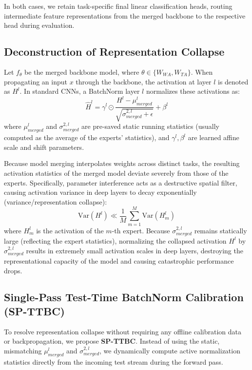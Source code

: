 \documentclass{article}
\theoremstyle{plain}
\theoremstyle{definition}
\theoremstyle{remark}
\begin{document}
In both cases, we retain task-specific final linear classification heads, routing intermediate feature representations from the merged backbone to the respective head during evaluation.

\subsection{Deconstruction of Representation Collapse}
Let $f_{\theta}$ be the merged backbone model, where $\theta \in \{W_{WA}, W_{TA}\}$. When propagating an input $x$ through the backbone, the activation at layer $l$ is denoted as $H^l$. In standard CNNs, a BatchNorm layer $l$ normalizes these activations as:
\begin{equation}
  \hat{H}^l = \gamma^l \odot \frac{H^l - \mu^l_{merged}}{\sqrt{\sigma^{2,l}_{merged} + \epsilon}} + \beta^l
\end{equation}
where $\mu^l_{merged}$ and $\sigma^{2,l}_{merged}$ are pre-saved static running statistics (usually computed as the average of the experts' statistics), and $\gamma^l, \beta^l$ are learned affine scale and shift parameters.

Because model merging interpolates weights across distinct tasks, the resulting activation statistics of the merged model deviate severely from those of the experts. Specifically, parameter interference acts as a destructive spatial filter, causing activation variance in deep layers to decay exponentially (variance/representation collapse):
\begin{equation}
  \text{Var}(H^l) \ll \frac{1}{M} \sum_{m=1}^M \text{Var}(H^l_m)
\end{equation}
where $H^l_m$ is the activation of the $m$-th expert. Because $\sigma^{2,l}_{merged}$ remains statically large (reflecting the expert statistics), normalizing the collapsed activation $H^l$ by $\sigma^{2,l}_{merged}$ results in extremely small activation scales in deep layers, destroying the representational capacity of the model and causing catastrophic performance drops.

\subsection{Single-Pass Test-Time BatchNorm Calibration (SP-TTBC)}
To resolve representation collapse without requiring any offline calibration data or backpropagation, we propose \textbf{SP-TTBC}. Instead of using the static, mismatching $\mu^l_{merged}$ and $\sigma^{2,l}_{merged}$, we dynamically compute active normalization statistics directly from the incoming test stream during the forward pass.
\end{document}

